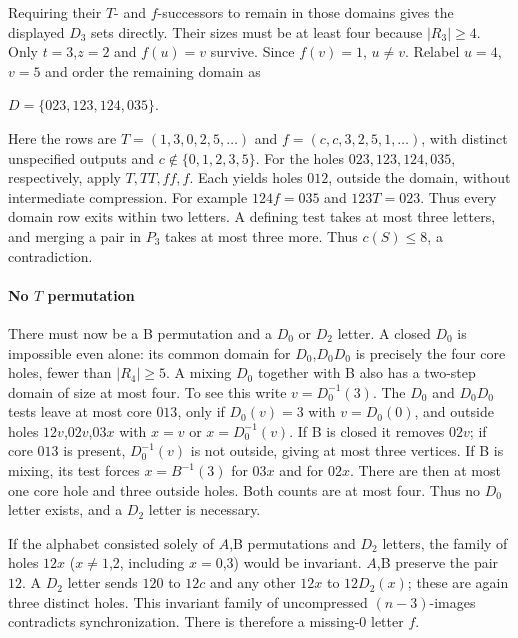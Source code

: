 \documentclass[11pt]{article}
\theoremstyle{definition}
\theoremstyle{plain}
\begin{document}
Requiring their \(T\)- and \(f\)-successors to remain in those domains
gives the displayed \(D_{3}\) sets directly. Their sizes must be at
least four because \(|R_{3}|\ge 4\). Only \(t=3\),\(z=2\) and \(f(u)=v\)
survive. Since \(f(v)=1\), \(u\ne v\). Relabel \(u=4\),\(v=5\) and order
the remaining domain as

\(D=\{023,123,124,035\}.\)

Here the rows are \(T=(1,3,0,2,5,\ldots)\) and \(f=(c,c,3,2,5,1,\ldots)\), with
distinct unspecified outputs and \(c\notin\{0,1,2,3,5\}\). For the holes
\(023,123,124,035\), respectively, apply \(T,TT,ff,f\). Each yields
holes \(012\), outside the domain, without intermediate compression. For
example \(124f=035\) and \(123T=023\). Thus every domain row exits
within two letters. A defining test takes at most three letters, and
merging a pair in \(P_3\) takes at most three more. Thus \(c(S)\le8\),
a contradiction.

\paragraph{No \(T\)
permutation}\label{no-t-permutation}

There must now be a B permutation and a \(D_{0}\) or \(D_{2}\)
letter. A closed \(D_{0}\) is impossible even alone: its common
domain for \(D_{0}\),\(D_{0}D_{0}\) is precisely the four core holes,
fewer than \(|R_{4}|\ge 5\). A mixing \(D_{0}\) together with B also
has a two-step domain of size at most four. To see this write
\(v=D_{0}^{-1}(3)\). The \(D_{0}\) and \(D_{0}D_{0}\) tests leave at
most core \(013\), only if \(D_{0}(v)=3\) with \(v=D_{0}(0)\), and outside
holes \(12v\),\(02v\),\(03x\) with \(x=v\) or \(x=D_{0}^{-1}(v)\).
If B is closed it removes \(02v\); if core \(013\) is present,
\(D_{0}^{-1}(v)\) is not outside, giving at most three vertices. If B is
mixing, its test forces \(x=B^{-1}(3)\) for \(03x\) and for \(02x\).
There are then at most one core hole and three outside holes. Both
counts are at most four. Thus no \(D_{0}\) letter exists, and a
\(D_{2}\) letter is necessary.

If the alphabet consisted solely of \(A\),B permutations and \(D_{2}\)
letters, the family of holes \(12x\) (\(x\ne 1\),2, including \(x=0\),3)
would be invariant. \(A\),B preserve the pair \(12\). A \(D_2\) letter
sends \(120\) to \(12c\) and any other \(12x\) to \(12\)\(D_{2}(x)\); these are
again three distinct holes. This invariant family of uncompressed
\((n-3)\)-images contradicts synchronization. There is therefore a
missing-0 letter \(f\).
\end{document}
